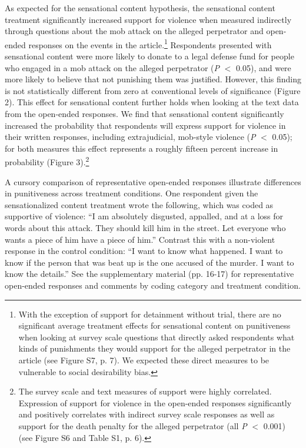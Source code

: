\documentclass[12pt, letterpaper]{article}
\begin{document}
As expected for the sensational content hypothesis, the sensational content treatment significantly increased support for violence when measured indirectly through questions about the mob attack on the alleged perpetrator and open-ended responses on the events in the article.\footnote{With the exception of support for detainment without trial, there are no significant average treatment effects for sensational content on punitiveness when looking at survey scale questions that directly asked respondents what kinds of punishments they would support for the alleged perpetrator in the article (see Figure S7, p. 7). We expected these direct measures to be vulnerable to social desirability bias.} Respondents presented with sensational content were more likely to donate to a legal defense fund for people who engaged in a mob attack on the alleged perpetrator (\textit{P} $<$ 0.05), and were more likely to believe that not punishing them was justified. However, this finding is not statistically different from zero at conventional levels of significance (Figure 2). This effect for sensational content further holds when looking at the text data from the open-ended responses. We find that sensational content significantly increased the probability that respondents will express support for violence in their written responses, including extrajudicial, mob-style violence (\textit{P} $<$ 0.05); for both measures this effect represents a roughly fifteen percent increase in probability (Figure 3).\footnote{The survey scale and text measures of support were highly correlated. Expression of support for violence in the open-ended responses significantly and positively correlates with indirect survey scale responses as well as support for the death penalty for the alleged perpetrator (all \textit{P} $<$ 0.001) (see Figure S6 and Table S1, p. 6).} 

A cursory comparison of representative open-ended responses illustrate differences in punitiveness across treatment conditions. One respondent given the sensationalized content treatment wrote the following, which was coded as supportive of violence: ``I am absolutely disgusted, appalled, and at a loss for words about this attack.  They should kill him in the street. Let everyone who wants a piece of him have a piece of him.'' Contrast this with a non-violent response in the control condition: ``I want to know what happened. I want to know if the person that was beat up is the one accused of the murder. I want to know the details.'' See the supplementary material (pp. 16-17) for representative open-ended responses and comments by coding category and treatment condition.
\end{document}
